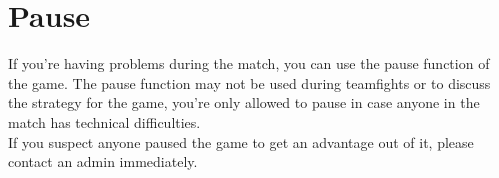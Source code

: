 \documentclass{article}
\begin{document}
\section{Pause}
If you're having problems during the match, you can use the pause function of the game. The pause function may not be used during teamfights or to discuss the strategy for the game, you're only allowed to pause in case anyone in the match has technical difficulties.
\\
If you suspect anyone paused the game to get an advantage out of it, please contact an admin immediately.
\end{document}
